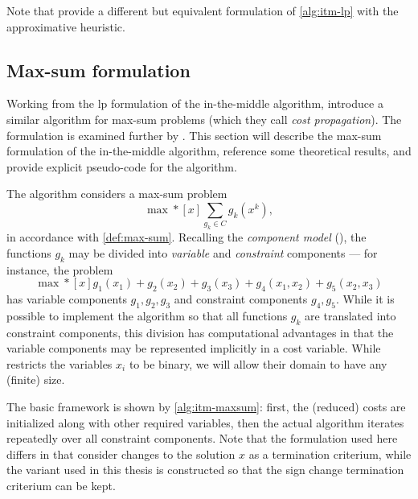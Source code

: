
Note that \textcite[\pno~97]{Bastert10} provide a different but equivalent formulation of \cref{alg:itm-lp} with the approximative heuristic.

\subsection{Max-sum formulation}
Working from the \gls{lp} formulation of the in-the-middle algorithm, \textcite{Wedelin08} introduce a similar algorithm for max-sum problems (which they call \emph{cost propagation}).
The formulation is examined further by \textcite[\pno~11\psqq]{Wedelin13}.
This section will describe the max-sum formulation of the in-the-middle algorithm, reference some theoretical results, and provide explicit pseudo-code for the algorithm.

The algorithm considers a max-sum problem
\begin{equation}\label{eq:maxsum}
	\max*[x] \sum_{g_k\in C} g_k(x^k),
\end{equation}
in accordance with \cref{def:max-sum}.
Recalling the \emph{component model} (), the functions \(g_k\) may be divided into \emph{variable} and \emph{constraint} components --- for instance, the problem
\begin{equation*}
	\max*[x] g_1(x_1) + g_2(x_2) + g_3(x_3) + g_4(x_1, x_2) + g_5(x_2, x_3)
\end{equation*}
has variable components \(g_1, g_2, g_3\) and constraint components \(g_4, g_5\).
While it is possible to implement the algorithm so that all functions \(g_k\) are translated into constraint components, this division has computational advantages in that the variable components may be represented implicitly in a cost variable.
While \textcite{Wedelin08} restricts the variables \(x_i\) to be binary, we will allow their domain to have any (finite) size.

The basic framework is shown by \cref{alg:itm-maxsum}: first, the (reduced) costs are initialized along with other required variables, then the actual algorithm iterates repeatedly over all constraint components.
Note that the formulation used here differs in that \textcite{Wedelin08} consider changes to the solution \(x\) as a termination criterium, while the variant used in this thesis is constructed so that the sign change termination criterium can be kept.

